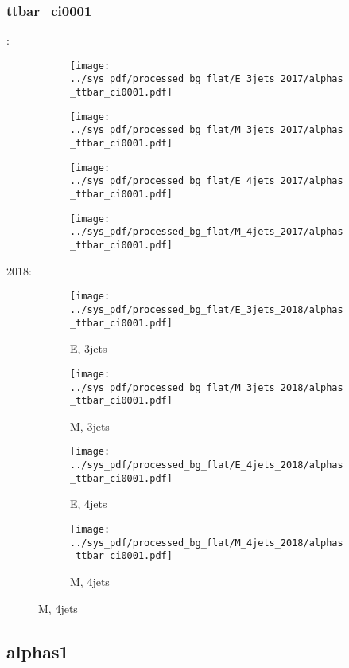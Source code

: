 \documentclass{beamer}
\begin{document}
\begin{frame}
\frametitle{ttbar_ci0001}
\fontsize{5}{1}:
\begin{figure}
\centering
\begin{subfigure}[b]{0.24\textwidth}
\texttt{[image: ../sys\_pdf/processed\_bg\_flat/E\_3jets\_2017/alphas\_ttbar\_ci0001.pdf]}
\end{subfigure}
\begin{subfigure}[b]{0.24\textwidth}
\texttt{[image: ../sys\_pdf/processed\_bg\_flat/M\_3jets\_2017/alphas\_ttbar\_ci0001.pdf]}
\end{subfigure}
\begin{subfigure}[b]{0.24\textwidth}
\texttt{[image: ../sys\_pdf/processed\_bg\_flat/E\_4jets\_2017/alphas\_ttbar\_ci0001.pdf]}
\end{subfigure}
\begin{subfigure}[b]{0.24\textwidth}
\texttt{[image: ../sys\_pdf/processed\_bg\_flat/M\_4jets\_2017/alphas\_ttbar\_ci0001.pdf]}
\end{subfigure}
\end{figure}
2018:
\begin{figure}
\centering
\begin{subfigure}[b]{0.24\textwidth}
\texttt{[image: ../sys\_pdf/processed\_bg\_flat/E\_3jets\_2018/alphas\_ttbar\_ci0001.pdf]}
\captionsetup{font=tiny}
\caption{E, 3jets}
\end{subfigure}
\begin{subfigure}[b]{0.24\textwidth}
\texttt{[image: ../sys\_pdf/processed\_bg\_flat/M\_3jets\_2018/alphas\_ttbar\_ci0001.pdf]}
\captionsetup{font=tiny}
\caption{M, 3jets}
\end{subfigure}
\begin{subfigure}[b]{0.24\textwidth}
\texttt{[image: ../sys\_pdf/processed\_bg\_flat/E\_4jets\_2018/alphas\_ttbar\_ci0001.pdf]}
\captionsetup{font=tiny}
\caption{E, 4jets}
\end{subfigure}
\begin{subfigure}[b]{0.24\textwidth}
\texttt{[image: ../sys\_pdf/processed\_bg\_flat/M\_4jets\_2018/alphas\_ttbar\_ci0001.pdf]}
\captionsetup{font=tiny}
\caption{M, 4jets}
\end{subfigure}
\end{figure}
\end{frame}


\subsection{alphas1}
\end{document}
